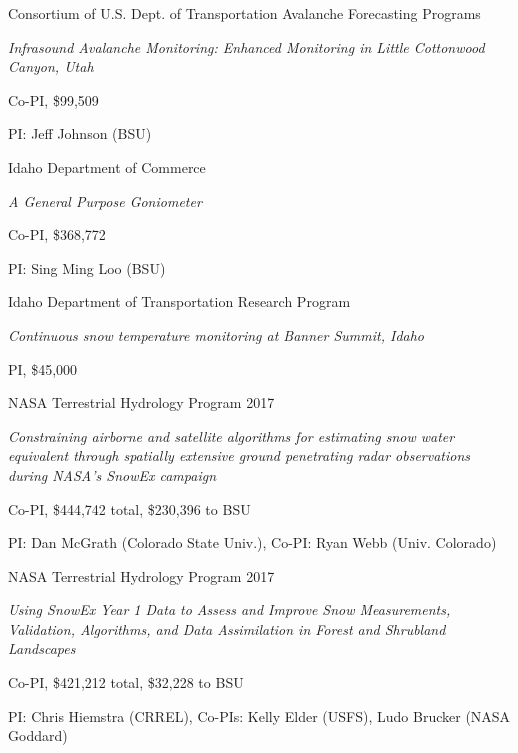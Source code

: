\documentclass[11pt]{article}
\renewenvironment{itemize}{
  \begin{list}{}{
    \setlength{\leftmargin}{1.5em}
    \setlength{\itemsep}{0pt}
    \setlength{\parskip}{0pt}
  }
}{
  \end{list}
}
\begin{document}
\begin{itemize}
\item[7/2019-12/2021] Consortium of U.S. Dept. of Transportation Avalanche Forecasting Programs
\begin{itemize}
\item \textit{Infrasound Avalanche Monitoring: Enhanced Monitoring in Little Cottonwood Canyon, Utah}
\item Co-PI, \$99,509
\item PI: Jeff Johnson (BSU)
\end{itemize}

\item[6/2018-7/2020] Idaho Department of Commerce
\begin{itemize}
  \item \textit{A General Purpose Goniometer}
  \item Co-PI, \$368,772
  \item PI: Sing Ming Loo (BSU)
\end{itemize}


\item[09/2018-12/2020] Idaho Department of Transportation Research Program
\begin{itemize}
  \item \textit{Continuous snow temperature monitoring at Banner Summit, Idaho}
  \item PI, \$45,000
\end{itemize}

\pagebreak

\item [6/2018-6/2021] NASA Terrestrial Hydrology Program 2017
\begin{itemize}
\item \textit{Constraining airborne and satellite algorithms for estimating snow water equivalent through spatially extensive ground penetrating radar observations during NASA's SnowEx campaign}
\item Co-PI, \$444,742 total, \$230,396 to BSU
\item PI: Dan McGrath (Colorado State Univ.), Co-PI: Ryan Webb (Univ. Colorado)
\end{itemize}

\item [6/2018-6/2021] NASA Terrestrial Hydrology Program 2017
\begin{itemize}
\item \textit{Using SnowEx Year 1 Data to Assess and Improve Snow Measurements, Validation, Algorithms, and Data Assimilation in Forest and Shrubland Landscapes}
\item Co-PI, \$421,212 total, \$32,228 to BSU
\item PI: Chris Hiemstra (CRREL), Co-PIs: Kelly Elder (USFS), Ludo Brucker (NASA Goddard)
\end{itemize}


\end{itemize}
\end{document}
